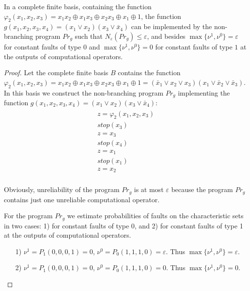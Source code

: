 \documentclass[
11pt,%
tightenlines,%
twoside,%
onecolumn,%
nofloats,%
nobibnotes,%
nofootinbib,%
superscriptaddress,%
noshowpacs,%
centertags]%
{revtex4}
\begin{document}
\begin{lemma}\label{l3}
In a complete finite basis, containing the function
$\varphi_2(x_1, x_2, x_3)=x_1 x_2\oplus x_1 x_3 \oplus x_2 x_3 \oplus
x_1 \oplus 1$, the function $g(x_1, x_2, x_3, x_4)= (x_1\vee x_2)  (x_3\vee \bar{x}_4)$ can be implemented by the non-branching program $Pr_g$ such that $N_\varepsilon(Pr_g)\leq \varepsilon$, and besides $\max\{\nu^1, \nu^0\}=\varepsilon$ for constant faults of type $0$ and $\max\{\nu^1, \nu^0\}=0$ for constant faults of type $1$ at the outputs of computational operators.
\end{lemma}

\begin{proof}
 Let the complete finite basis $B$ contains the function $\varphi_2(x_1, x_2, x_3)=x_1 x_2\oplus x_1 x_3 \oplus x_2 x_3 \oplus x_1 \oplus 1=(\bar{x}_1\vee x_2\vee x_3)(x_1\vee\bar{x}_2\vee\bar{x}_3)$. In this basis we construct the non-branching program $Pr_g$ implementing the function $g(x_1, x_2, x_3, x_4)= (x_1\vee x_2)  (x_3\vee \bar{x}_4)$:
\begin{eqnarray*}
\begin{array}{l}
  z=\varphi_2(x_1, x_2, x_3) \\
  stop(x_3) \\
  z=x_3 \\
  stop(x_4) \\
  z=x_1 \\
  stop(x_1) \\
  z=x_2 \\
\end{array}
\end{eqnarray*}

Obviously, unreliability of the program $Pr_g$ is at most $\varepsilon$ because the program $Pr_g$ contains just one unreliable computational operator.

For the program $Pr_g$ we estimate probabilities of faults on the characteristic sets in two cases: 1) for constant faults of type 0, and 2) for constant faults of type 1 at the outputs of computational operators.
\begin{itemize}
\item[1)] $\nu^1=P_1(0, 0, 0, 1)=0$,  $\nu^0=P_0(1, 1, 1, 0)=\varepsilon$. Thus $\max\{\nu^1, \nu^0\}=\varepsilon$.
\item[2)] $\nu^1=P_1(0, 0, 0, 1)=0$,  $\nu^0=P_0(1, 1, 1, 0)=0$. Thus $\max\{\nu^1, \nu^0\}=0$.
\end{itemize}

\end{proof}
\end{document}

